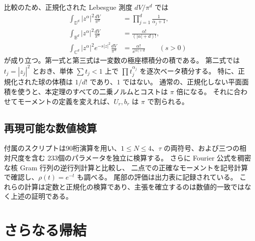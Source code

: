 \documentclass[12pt]{amsart}
\theoremstyle{definition}
\theoremstyle{remark}
\numberwithin{equation}{section}
\newcommand{\C}{\mathbb{C}}
\newcommand{\D}{\mathbb{D}}
\theoremstyle{definition}
\begin{document}
比較のため、正規化された Lebesgue 測度 $dV/\pi^d$ では
\begin{equation}\label{ja:modelnorms}
\begin{aligned}
 \int_{\D^d}|z^\alpha|^2\frac{dV}{\pi^d}
   &=\prod_{j=1}^d\frac1{\alpha_j+1},\\
 \int_{\mathbb B^d}|z^\alpha|^2\frac{dV}{\pi^d}
   &=\frac{\alpha!}{(|\alpha|+d)!},\\
 \int_{\C^d}|z^\alpha|^2e^{-s|z|^2}\frac{dV}{\pi^d}
   &=\frac{\alpha!}{s^{|\alpha|+d}}\qquad(s>0)
\end{aligned}
\end{equation}
が成り立つ。第一式と第三式は一変数の極座標積分の積である。
第二式では $t_j=|z_j|^2$ とおき、単体 $\sum t_j<1$ 上で
$\prod t_j^{\alpha_j}$ を逐次ベータ積分する。
特に、正規化された球の体積は $1/d!$ であり、$1$ ではない。
通常の、正規化しない平面面積を使うと、本定理のすべての二乗ノルムとコストは $\pi$ 倍になる。
それに合わせてモーメントの定義を変えれば、$U_r,b_r$ は $\pi$ で割られる。

\subsection{再現可能な数値検算}
付属のスクリプトは90桁演算を用い、$1\le N\le4$、$\tau$ の両符号、および三つの相対尺度を含む
233個のパラメータを独立に検算する。
さらに Fourier 公式を稠密な核 Gram 行列の逆行列計算と比較し、
二点での正確なモーメントを記号計算で確認し、$\rho(t)=e^{-t}$ も調べる。
尾部の評価は出力表に記録されている。
これらの計算は定数と正規化の検算であり、主張を確立するのは数値的一致ではなく上述の証明である。

\section{さらなる帰結}
\end{document}
